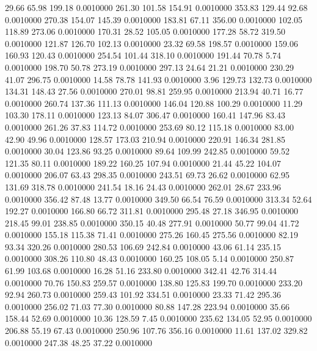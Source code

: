   29.66   65.98  199.18   0.0010000
 261.30  101.58  154.91   0.0010000
 353.83  129.44   92.68   0.0010000
 270.38  154.07  145.39   0.0010000
 183.81   67.11  356.00   0.0010000
 102.05  118.89  273.06   0.0010000
 170.31   28.52  105.05   0.0010000
 177.28   58.72  319.50   0.0010000
 121.87  126.70  102.13   0.0010000
  23.32   69.58  198.57   0.0010000
 159.06  160.93  120.43   0.0010000
 254.54  101.44  318.10   0.0010000
 191.44   70.78    5.74   0.0010000
 198.70   50.78  273.19   0.0010000
 297.13   24.64   21.21   0.0010000
 230.29   41.07  296.75   0.0010000
  14.58   78.78  141.93   0.0010000
   3.96  129.73  132.73   0.0010000
 134.31  148.43   27.56   0.0010000
 270.01   98.81  259.95   0.0010000
 213.94   40.71   16.77   0.0010000
 260.74  137.36  111.13   0.0010000
 146.04  120.88  100.29   0.0010000
  11.29  103.30  178.11   0.0010000
 123.13   84.07  306.47   0.0010000
 160.41  147.96   83.43   0.0010000
 261.26   37.83  114.72   0.0010000
 253.69   80.12  115.18   0.0010000
  83.00   42.90   49.96   0.0010000
 128.57  173.03  210.94   0.0010000
 220.91  146.34  281.85   0.0010000
  30.04  123.86   93.25   0.0010000
  89.64  109.99  242.85   0.0010000
  59.52  121.35   80.11   0.0010000
 189.22  160.25  107.94   0.0010000
  21.44   45.22  104.07   0.0010000
 206.07   63.43  298.35   0.0010000
 243.51   69.73   26.62   0.0010000
  62.95  131.69  318.78   0.0010000
 241.54   18.16   24.43   0.0010000
 262.01   28.67  233.96   0.0010000
 356.42   87.48   13.77   0.0010000
 349.50   66.54   76.59   0.0010000
 313.34   52.64  192.27   0.0010000
 166.80   66.72  311.81   0.0010000
 295.48   27.18  346.95   0.0010000
 218.45   99.01  238.85   0.0010000
 350.15   40.48  277.91   0.0010000
  50.77   99.04   41.72   0.0010000
 155.18  115.38   71.41   0.0010000
 275.26  160.45  275.56   0.0010000
  82.19   93.34  320.26   0.0010000
 280.53  106.69  242.84   0.0010000
  43.06   61.14  235.15   0.0010000
 308.26  110.80   48.43   0.0010000
 160.25  108.05    5.14   0.0010000
 250.87   61.99  103.68   0.0010000
  16.28   51.16  233.80   0.0010000
 342.41   42.76  314.44   0.0010000
  70.76  150.83  259.57   0.0010000
 138.80  125.83  199.70   0.0010000
 233.20   92.94  260.73   0.0010000
 259.43  101.92  334.51   0.0010000
  23.33   71.42  295.36   0.0010000
 256.02   71.03   77.30   0.0010000
  80.88  147.28  223.94   0.0010000
  35.66  158.44   52.69   0.0010000
  10.36  128.59    7.45   0.0010000
 235.62  134.05   52.95   0.0010000
 206.88   55.19   67.43   0.0010000
 250.96  107.76  356.16   0.0010000
  11.61  137.02  329.82   0.0010000
 247.38   48.25   37.22   0.0010000
